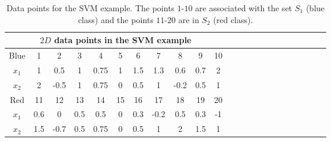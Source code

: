 \documentclass[journal,twoside,web]{ieeecolor}
\begin{document}
\begin{table}[t]
\centering
\begin{tabular}{ccccccccccccccccccccccc}
\hline
\multicolumn{11}{|c|}{$2D$ data points in the SVM example} \\
\hline
Blue & 1 & 2 & 3 & 4 & 5 & 6 & 7 & 8 & 9 & 10\\
\hline
$x_1$ & 1 & 0.5 & 1 & 0.75 & 1 & 1.5 & 1.3 & 0.6 & 0.7 & 2\\
$x_2$ & 2 & -0.5 & 1 & 0.75 & 0 & 0.5 & 1 & -0.2 & 0.5 & 1\\
\hline
Red & 11 & 12 & 13 & 14 & 15 & 16 & 17 & 18 & 19 & 20\\
\hline
$x_1$ & 0.6 & 0 & 0.5 & 0.5 & 0 & 0.3 & -0.2 & 0.5 & 0.3 & -1\\
$x_2$ & 1.5 & -0.7 & 0.5 & 0.75 & 0 & 0.5 & 1 & 2 & 1.5 & 1\\
\end{tabular}
\caption{Data points for the SVM example. The points $1$-$10$ are associated with the set $S_1$ (blue class) and the points $11$-$20$ are in $S_2$ (red class).}
\label{table_nodes}
\end{table}
\end{document}
